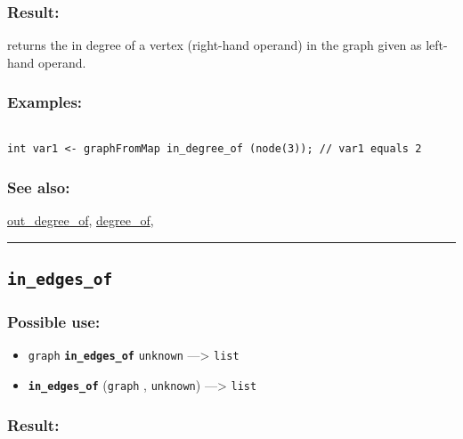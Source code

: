\documentclass[]{book}
\providecommand{\tightlist}{%
  \setlength{\itemsep}{0pt}\setlength{\parskip}{0pt}}
\theoremstyle{definition}
\theoremstyle{definition}
\theoremstyle{definition}
\theoremstyle{remark}
\begin{document}
\subsubsection{Result:}\label{result-257}

returns the in degree of a vertex (right-hand operand) in the graph
given as left-hand operand.

\subsubsection{Examples:}\label{examples-205}

\begin{verbatim}
 
int var1 <- graphFromMap in_degree_of (node(3)); // var1 equals 2
\end{verbatim}

\subsubsection{See also:}\label{see-also-115}

\href{OperatorsNR\#out_degree_of}{out\_degree\_of},
\href{OperatorsDH\#degree_of}{degree\_of},

\begin{center}\rule{0.5\linewidth}{\linethickness}\end{center}

\subsection{\texorpdfstring{\texttt{in\_edges\_of}}{in\_edges\_of}}\label{in_edges_of}

\subsubsection{Possible use:}\label{possible-use-268}

\begin{itemize}
\tightlist
\item
  \texttt{graph} \textbf{\texttt{in\_edges\_of}} \texttt{unknown}
  ---\textgreater{} \texttt{list}
\item
  \textbf{\texttt{in\_edges\_of}} (\texttt{graph} , \texttt{unknown})
  ---\textgreater{} \texttt{list}
\end{itemize}

\subsubsection{Result:}\label{result-258}
\end{document}
